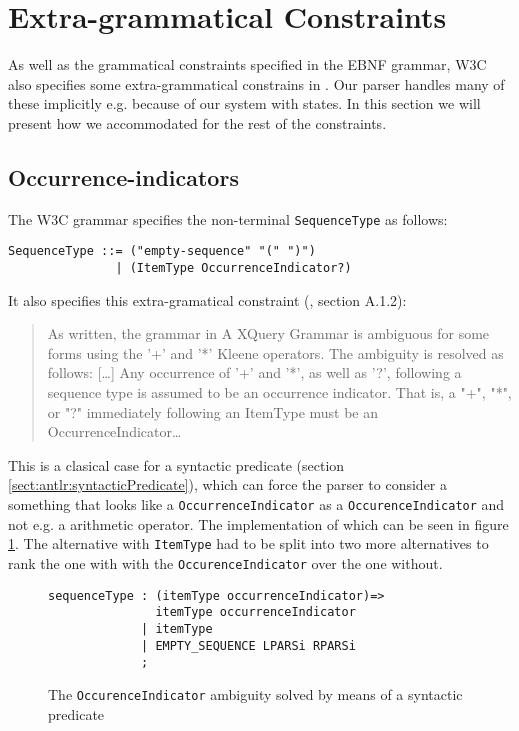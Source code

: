 \section{Extra-grammatical Constraints}

As well as the grammatical constraints specified in the EBNF grammar, W3C also specifies some extra-grammatical constrains in \cite{w3c00}. Our parser handles many of these implicitly e.g. because of our system with states. In this section we will present how we accommodated for the rest of the constraints. 

\subsection{Occurrence-indicators}

The W3C grammar specifies the non-terminal \verb!SequenceType! as follows:
\begin{verbatim}
SequenceType ::= ("empty-sequence" "(" ")")
               | (ItemType OccurrenceIndicator?)
\end{verbatim}
It also specifies this extra-gramatical constraint (\cite{w3c00}, section A.1.2):
\begin{quote}
As written, the grammar in A XQuery Grammar is ambiguous for some forms using the '+' and '*' Kleene operators. The ambiguity is resolved as follows: [\ldots] Any occurrence of '+' and '*', as well as '?', following a sequence type is assumed to be an occurrence indicator. That is, a "+", "*", or "?" immediately following an ItemType must be an OccurrenceIndicator\ldots
\end{quote}

This is a clasical case for a syntactic predicate (section \ref{sect:antlr:syntacticPredicate}), which can force the parser to consider a something that looks like a \verb!OccurrenceIndicator! as a \verb!OccurenceIndicator! and not e.g. a arithmetic operator. The implementation of which can be seen in figure \ref{fig:occurrenceIndicator}. The alternative with \verb!ItemType! had to be split into two more alternatives to rank the one with with the \verb!OccurenceIndicator! over the one without.

\begin{figure}[h!]
\begin{verbatim}
sequenceType : (itemType occurrenceIndicator)=> 
               itemType occurrenceIndicator
             | itemType
             | EMPTY_SEQUENCE LPARSi RPARSi
             ;
\end{verbatim}
\caption[The \texttt{OccurenceIndicator} ambiguity solved]{The \texttt{OccurenceIndicator} ambiguity solved by means of a syntactic predicate}
\label{fig:occurrenceIndicator}
\end{figure}

